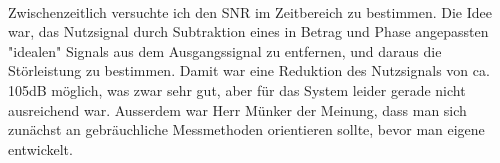 \documentclass[11pt]{article}
\begin{document}
\\
Zwischenzeitlich versuchte ich den SNR im Zeitbereich zu bestimmen. Die Idee war, das Nutzsignal durch Subtraktion eines in Betrag und Phase angepassten "idealen" Signals aus dem Ausgangssignal zu entfernen, und daraus die Störleistung zu bestimmen. Damit war eine Reduktion des Nutzsignals von ca. 105dB möglich, was zwar sehr gut, aber für das System leider gerade nicht ausreichend war. Ausserdem war Herr Münker der Meinung, dass man sich zunächst an gebräuchliche Messmethoden orientieren sollte, bevor man eigene entwickelt. \\
\\



\end{document}

